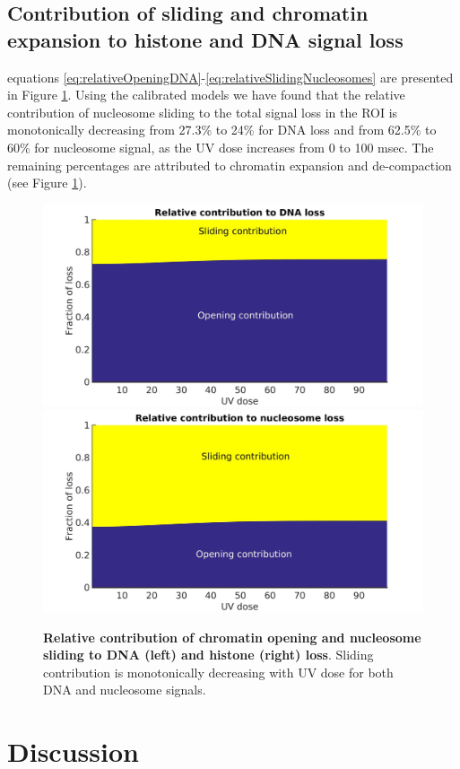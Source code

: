 \documentclass[12pt]{article}
\begin{document}
   \subsection{Contribution of sliding and chromatin expansion to histone and DNA signal loss}
   equations \eqref{eq:relativeOpeningDNA}-\eqref{eq:relativeSlidingNucleosomes} are presented in Figure \ref{fig:relatiiveContributionToLoss}.
   		Using the calibrated models we have found that the relative contribution
   		of nucleosome sliding to the total signal loss in the ROI is monotonically
   		decreasing from 27.3\% to 24\% for DNA loss and from 62.5\% to 60\% for nucleosome signal,
   		as the UV dose increases from 0 to 100 msec. The remaining percentages are
   		attributed to chromatin expansion and de-compaction (see Figure \ref{fig:relatiiveContributionToLoss}).
   		
   		\begin{figure}[H]
   			\includegraphics[width=0.5\linewidth, height=0.3\textheight]{relatiiveContributionToDNALoss}
   			\includegraphics[width=0.5\linewidth, height=0.3\textheight]{relativeContributionToHistoneLoss}
   			\caption{\textbf{Relative contribution of chromatin opening and nucleosome sliding to DNA (left) and histone (right) loss}. Sliding contribution is monotonically decreasing with UV dose for both DNA and nucleosome signals.}
   			\label{fig:relatiiveContributionToLoss}
   		\end{figure}	
   		
   \section{Discussion}
   		
	
	 
\end{document}
